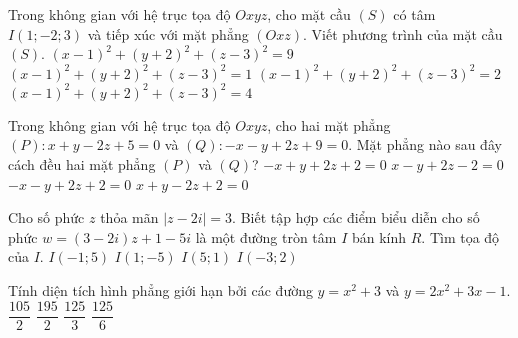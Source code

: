 	\begin{ex}%
		Trong không gian với hệ trục tọa độ $Oxyz$, cho mặt cầu $(S)$ có tâm $I(1;-2;3)$ và tiếp xúc với mặt phẳng $(Oxz)$. Viết phương trình của mặt cầu $(S)$.
		\choice
		{$(x-1)^2+(y+2)^2+(z-3)^2=9$}
		{$(x-1)^2+(y+2)^2+(z-3)^2=1$}
		{$(x-1)^2+(y+2)^2+(z-3)^2=2$}
		{\True $(x-1)^2+(y+2)^2+(z-3)^2=4$}
	\end{ex}
	\begin{ex}%
		Trong không gian với hệ trục tọa độ $Oxyz$, cho hai mặt phẳng $(P):x+y-2z+5=0$ và $(Q):-x-y+2z+9=0$. Mặt phẳng nào sau đây cách đều hai mặt phẳng $(P)$ và $(Q)$?
		\choice
		{$-x+y+2z+2=0$}
		{$x-y+2z-2=0$}
		{\True $-x-y+2z+2=0$}
		{$x+y-2z+2=0$}
	\end{ex}
	\begin{ex}%
		Cho số phức $z$ thỏa mãn $|z-2i|=3$. Biết tập hợp các điểm biểu diễn cho số phức $w=(3-2i)z+1-5i$ là một đường tròn tâm $I$ bán kính $R$. Tìm tọa độ của $I$.
		\choice
		{$I(-1;5)$}
		{$I(1;-5)$}
		{\True $I(5;1)$}
		{$I(-3;2)$}
	\end{ex}
	\begin{ex}%
		Tính diện tích hình phẳng giới hạn bởi các đường $y=x^2+3$ và $y=2x^2+3x-1$.
		\choice
		{$\dfrac{105}{2}$}
		{$\dfrac{195}{2}$}
		{$\dfrac{125}{3}$}
		{\True $\dfrac{125}{6}$}
	\end{ex}
